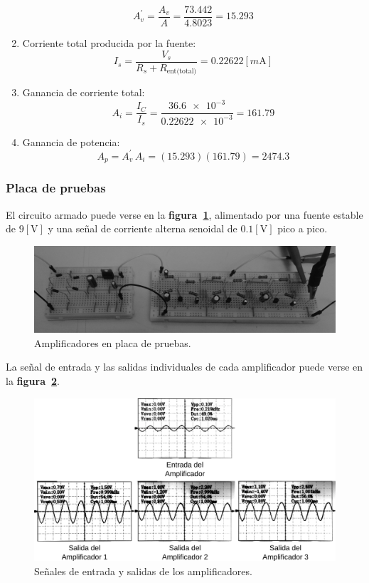 \begin{enumerate}
\begin{equation*}
    A_v^{'} = \frac{A_v}{A}
            = \frac{73.442}{4.8023}
            = 15.293
\end{equation*}
\item Corriente total producida por la fuente:
\begin{equation*}
    I_s = \frac{V_s}{R_s+R_{\text{ent(total)}}}
        = 0.22622[m\text{A}]
\end{equation*}
\item Ganancia de corriente total:
\begin{equation*}
    A_i = \frac{I_C}{I_s}
        = \frac{\num{36.6e-3}}{\num{0.22622e-3}}
        = 161.79
\end{equation*}
\item Ganancia de potencia:
\begin{equation*}
    A_p = A_v^{'}\,A_i
        = (15.293)(161.79)
        = 2474.3
\end{equation*}
\end{enumerate}

\subsubsection{Placa de pruebas}
El circuito armado puede verse en la \textbf{figura~\ref{figura18}}, alimentado
por una fuente estable de $9[\text{V}]$ y una señal de corriente alterna
senoidal de $0.1[\text{V}]$ pico a pico.

\begin{figure}[!h]
\centering
\includegraphics[scale=0.12]{diagramas/figura18.eps}
\caption{Amplificadores en placa de pruebas.}
\label{figura18}
\end{figure}

La señal de entrada y las salidas individuales de cada amplificador puede verse
en la \textbf{figura~\ref{figura19}}.

\begin{figure}[!h]
\centering
\includegraphics[scale=0.10]{diagramas/figura19.eps}
\caption{Señales de entrada y salidas de los amplificadores.}
\label{figura19}
\end{figure}

